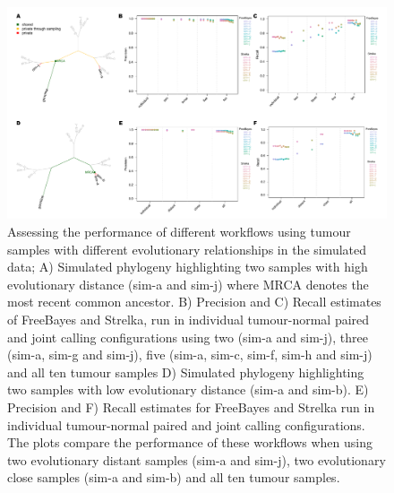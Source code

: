 \begin{figure}[!ht]
\centering
  \includegraphics[width=\textwidth]{Appendices/Variantcalling/supp/S6}
  \caption[Assessing the performance of different workflows using tumour samples with different evolutionary relationships in the simulated data]{Assessing the performance of different workflows using tumour samples with different evolutionary relationships in the simulated data; A) Simulated phylogeny highlighting two samples with high evolutionary distance (sim-a and sim-j) where MRCA denotes the most recent common ancestor. B) Precision and C) Recall estimates of FreeBayes and Strelka, run in individual tumour-normal paired and joint calling configurations using two (sim-a and sim-j), three (sim-a, sim-g and sim-j), five (sim-a, sim-c, sim-f, sim-h and sim-j) and all ten tumour samples D) Simulated phylogeny highlighting two samples with low evolutionary distance (sim-a and sim-b). E) Precision and F) Recall estimates for FreeBayes and Strelka run in individual tumour-normal paired and joint calling configurations. The plots compare the performance of these workflows when using two evolutionary distant samples (sim-a and sim-j), two evolutionary close samples (sim-a and sim-b) and all ten tumour samples.}\label{A:fig:S06}
\end{figure}


